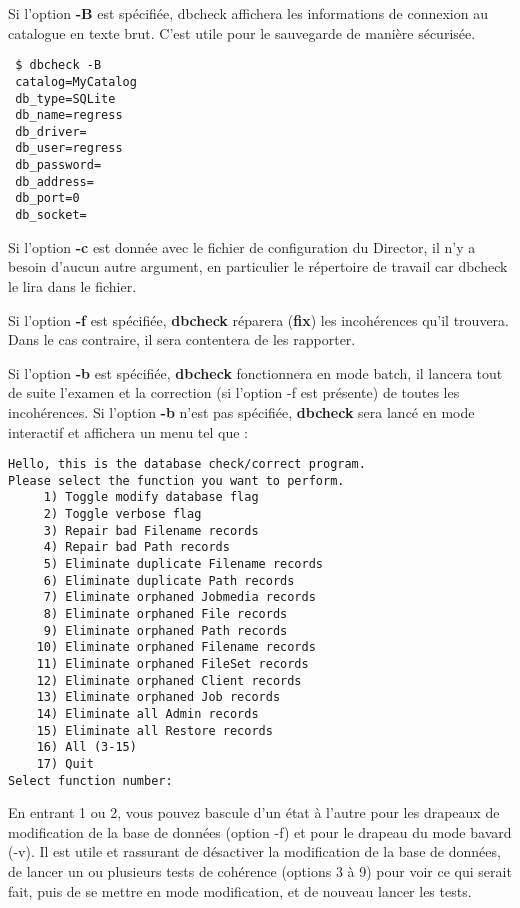 Si l'option \textbf{-B} est spécifiée, dbcheck affichera les informations de 
connexion au catalogue en texte brut. C'est utile pour le sauvegarde de manière
sécurisée.

\begin{verbatim}
 $ dbcheck -B 
 catalog=MyCatalog
 db_type=SQLite
 db_name=regress
 db_driver=
 db_user=regress
 db_password=
 db_address=
 db_port=0
 db_socket=
\end{verbatim} %

Si l'option {\bf -c} est donnée avec le fichier de configuration du Director, 
il n'y a besoin d'aucun autre argument, en particulier le répertoire de travail
car dbcheck le lira dans le fichier.


Si l'option {\bf -f} est spécifiée, {\bf dbcheck} réparera ({\bf fix}) les 
incohérences qu'il trouvera. Dans le cas contraire, il sera contentera de les
rapporter.

Si l'option {\bf -b} est spécifiée, {\bf dbcheck} fonctionnera en mode batch, il
lancera tout de suite l'examen et la correction (si l'option -f est présente)
de toutes les incohérences. Si l'option {\bf -b} n'est pas spécifiée, 
{\bf dbcheck} sera lancé en mode interactif et affichera un menu tel que :

\footnotesize
\begin{verbatim}
Hello, this is the database check/correct program.
Please select the function you want to perform.
     1) Toggle modify database flag
     2) Toggle verbose flag
     3) Repair bad Filename records
     4) Repair bad Path records
     5) Eliminate duplicate Filename records
     6) Eliminate duplicate Path records
     7) Eliminate orphaned Jobmedia records
     8) Eliminate orphaned File records
     9) Eliminate orphaned Path records
    10) Eliminate orphaned Filename records
    11) Eliminate orphaned FileSet records
    12) Eliminate orphaned Client records
    13) Eliminate orphaned Job records
    14) Eliminate all Admin records
    15) Eliminate all Restore records
    16) All (3-15)
    17) Quit
Select function number:
\end{verbatim}
\normalsize

En entrant 1 ou 2, vous pouvez bascule d'un état à l'autre pour les drapeaux
de modification de la base de données (option -f) et pour le drapeau du mode
bavard (-v). Il est utile et rassurant de désactiver la modification de la
base de données, de lancer un ou plusieurs tests de cohérence (options 3 à 9)
pour voir ce qui serait fait, puis de se mettre en mode modification, et de
nouveau lancer les tests.


